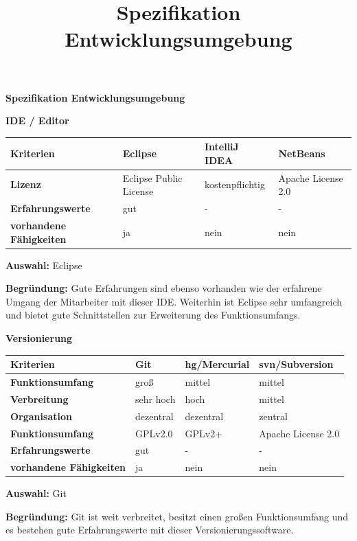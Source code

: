 \documentclass[12pt]{article}
\title{Spezifikation Entwicklungsumgebung}
\begin{document}
\large \textbf{Spezifikation Entwicklungsumgebung}

\normalsize

\vspace*{7mm}

\textbf{IDE / Editor}

\begin{tabularx}{\textwidth}{|X|X|X|X|}\hline
 \textbf{Kriterien}&\textbf{Eclipse}&\textbf{IntelliJ IDEA}&\textbf{NetBeans}\\ \hline
 \textbf{Lizenz}&Eclipse Public License&kostenpflichtig&Apache License 2.0\\ \hline
 \textbf{Erfahrungswerte}&gut&-&-\\ \hline
 \textbf{vorhandene Fähigkeiten}&ja&nein&nein\\ \hline
\end{tabularx}

\vspace*{3mm}

\textbf{Auswahl:} Eclipse

\textbf{Begründung:} Gute Erfahrungen sind ebenso vorhanden wie der erfahrene Umgang der Mitarbeiter mit dieser IDE. Weiterhin ist Eclipse sehr umfangreich und bietet gute Schnittstellen zur Erweiterung des Funktionsumfangs.

\vspace*{10mm}

\textbf{Versionierung}

\begin{tabularx}{\textwidth}{|X|X|X|X|}\hline
 \textbf{Kriterien}&\textbf{Git}&\textbf{hg/Mercurial}&\textbf{svn/Subversion}\\ \hline
 \textbf{Funktionsumfang}&groß&mittel&mittel\\ \hline
 \textbf{Verbreitung}&sehr hoch&hoch&mittel\\ \hline
 \textbf{Organisation}&dezentral&dezentral&zentral\\ \hline
 \textbf{Funktionsumfang}&GPLv2.0&GPLv2+&Apache License 2.0\\ \hline
 \textbf{Erfahrungswerte}&gut&-&-\\ \hline
 \textbf{vorhandene Fähigkeiten}&ja&nein&nein\\ \hline
\end{tabularx}

\vspace*{3mm}

\textbf{Auswahl:} Git

\textbf{Begründung:} Git ist weit verbreitet, besitzt einen großen Funktionsumfang und es bestehen gute Erfahrungswerte mit dieser Versionierungssoftware.
\end{document}
